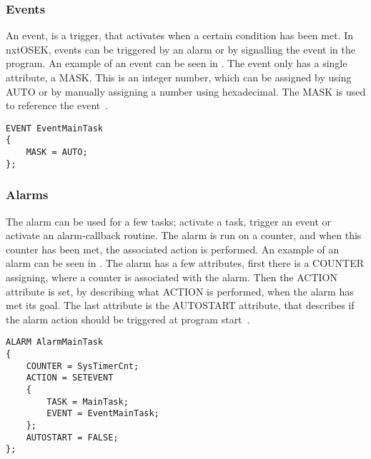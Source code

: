 \subsubsection{Events} \label{sec:events}
An event, is a trigger, that activates when a certain condition has been met. In nxtOSEK, events can be triggered by an alarm or by signalling the event in the program. An example of an event can be seen in . The event only has a single attribute, a MASK. This is an integer number, which can be assigned by using AUTO or by manually assigning a number using hexadecimal. The MASK is used to reference the event~\citep{osekoil}. 

\begin{lstlisting}[caption= An example of a task used in the \projname{}, label=lst:eventexample]
EVENT EventMainTask
{
    MASK = AUTO;
};
\end{lstlisting}

\subsubsection{Alarms} \label{sec:alarms}
The alarm can be used for a few tasks; activate a task, trigger an event or activate an alarm-callback routine. The alarm is run on a counter, and when this counter has been met, the associated action is performed. An example of an alarm can be seen in . The alarm has a few attributes, first there is a COUNTER assigning, where a counter is associated with the alarm. Then the ACTION attribute is set, by describing what ACTION is performed, when the alarm has met its goal. The last attribute is the AUTOSTART attribute, that describes if the alarm action should be triggered at program start~\citep{osekoil}.

\begin{lstlisting}[caption= An example of a task used in the \projname{}, label=lst:alarmexample]
ALARM AlarmMainTask
{
    COUNTER = SysTimerCnt;
    ACTION = SETEVENT
    {
        TASK = MainTask;
        EVENT = EventMainTask;
    };
    AUTOSTART = FALSE;
};
\end{lstlisting}

